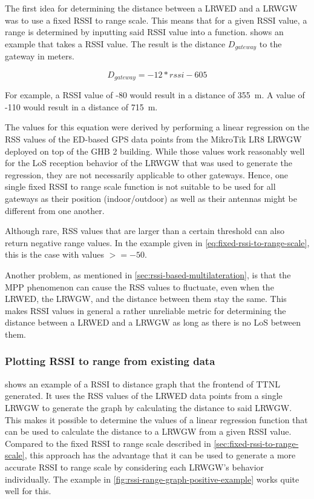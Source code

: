 The first idea for determining the distance between a \acl{LRWED} and a \acl{LRWGW} was to use a fixed \ac{RSSI} to range scale.
This means that for a given \ac{RSSI} value, a range is determined by inputting said \ac{RSSI} value into a function.
 shows an example that takes a \ac{RSSI} value.
The result is the distance $D_{gateway}$ to the gateway in meters.

\begin{equation}\label{eq:fixed-rssi-to-range-scale}
    D_{gateway} = -12 * rssi - 605
\end{equation}

For example, a \ac{RSSI} value of -80 would result in a distance of \SI{355}{\meter}.
A value of -110 would result in a distance of \SI{715}{\meter}.

The values for this equation were derived by performing a linear regression on the \ac{RSS} values of the \acl{ED}-based GPS data points from the MikroTik LR8 \acl{LRWGW} deployed on top of the \ac{GHB} 2 building.
While those values work reasonably well for the \ac{LoS} reception behavior of the \acl{LRWGW} that was used to generate the regression, they are not necessarily applicable to other gateways.
Hence, one single fixed \ac{RSSI} to range scale function is not suitable to be used for all gateways as their position (indoor/outdoor) as well as their antennas might be different from one another.

Although rare, \ac{RSS} values that are larger than a certain threshold can also return negative range values.
In the example given in \cref{eq:fixed-rssi-to-range-scale}, this is the case with values $>= -50$.

Another problem, as mentioned in \cref{sec:rssi-based-multilateration}, is that the \ac{MPP} phenomenon can cause the \ac{RSS} values to fluctuate, even when the \acl{LRWED}, the \acl{LRWGW}, and the distance between them stay the same.
This makes RSSI values in general a rather unreliable metric for determining the distance between a \acl{LRWED} and a \acl{LRWGW} as long as there is no \ac{LoS} between them.

\subsubsection{Plotting \acs{RSSI} to range from existing data}\label{sec:plotting-rssi-to-range-from-existing-data}

 shows an example of a \ac{RSSI} to distance graph that the frontend of \ac{TTNL} generated.
It uses the \ac{RSS} values of the \acl{LRWED} data points from a single \acl{LRWGW} to generate the graph by calculating the distance to said \acl{LRWGW}.
This makes it possible to determine the values of a linear regression function that can be used to calculate the distance to a \acl{LRWGW} from a given \ac{RSSI} value.
Compared to the fixed \ac{RSSI} to range scale described in \cref{sec:fixed-rssi-to-range-scale}, this approach has the advantage that it can be used to generate a more accurate \ac{RSSI} to range scale by considering each \acl{LRWGW}'s behavior individually.
The example in \cref{fig:rssi-range-graph-positive-example} works quite well for this.


